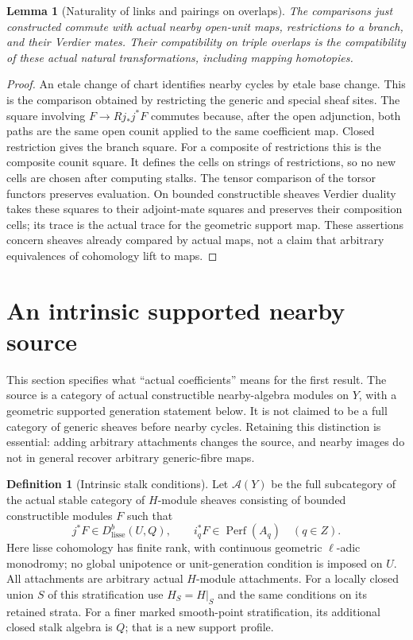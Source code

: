 \documentclass[11pt]{article}
\newtheorem{lemma}[theorem]{Lemma}
\theoremstyle{definition}
\newtheorem{definition}[theorem]{Definition}
\theoremstyle{remark}
\newcommand{\Perf}{\operatorname{Perf}}
\begin{document}
\begin{lemma}[Naturality of links and pairings on overlaps]
\label{lem:overlap-mates}
The comparisons just constructed commute with actual nearby
open-unit maps, restrictions to a branch, and their Verdier mates.
Their compatibility on triple overlaps is the compatibility of
these actual natural transformations, including mapping homotopies.
\end{lemma}
\begin{proof}
An etale change of chart identifies nearby cycles by etale base
change.  This is the comparison obtained by restricting the generic
and special sheaf sites.  The square involving $F\to Rj_*j^*F$
commutes because, after the open adjunction, both paths are the
same open counit applied to the same coefficient map.  Closed
restriction gives the branch square.  For a composite of restrictions
this is the composite counit square.  It defines the cells on strings
of restrictions, so no new cells are chosen after computing stalks.
The tensor comparison of the torsor functors preserves evaluation.
On bounded constructible sheaves Verdier duality takes these squares
to their adjoint-mate squares and preserves their composition cells;
its trace is the actual trace for the geometric support map.
These assertions concern sheaves already compared by actual maps,
not a claim that arbitrary equivalences of cohomology lift to maps.
\end{proof}

\section{An intrinsic supported nearby source}
\label{sec:supported-source}
This section specifies what ``actual coefficients'' means for the
first result.  The source is a category of actual constructible
nearby-algebra modules on $Y$, with a geometric supported generation
statement below.  It is not claimed to be a full category of generic
sheaves before nearby cycles.  Retaining this distinction is essential:
adding arbitrary attachments changes the source, and nearby images
do not in general recover arbitrary generic-fibre maps.

\begin{definition}[Intrinsic stalk conditions]
\label{def:intrinsic-source}
Let $\mathcal A(Y)$ be the full subcategory of the actual stable
category of $H$-module sheaves consisting of bounded constructible
modules $F$ such that
\[
 j^*F\in D^b_{\mathrm{lisse}}(U,Q),\qquad
 i_q^*F\in\Perf(A_q)\quad(q\in Z).
\]
Here lisse cohomology has finite rank, with continuous geometric
$\ell$-adic monodromy; no global unipotence or unit-generation
condition is imposed on $U$.  All attachments are arbitrary actual
$H$-module attachments.  For a locally closed union $S$ of this
stratification use $H_S=H|_S$ and the same conditions on its retained
strata.  For a finer marked smooth-point stratification, its additional
closed stalk algebra is $Q$; that is a new support profile.
\end{definition}
\end{document}
